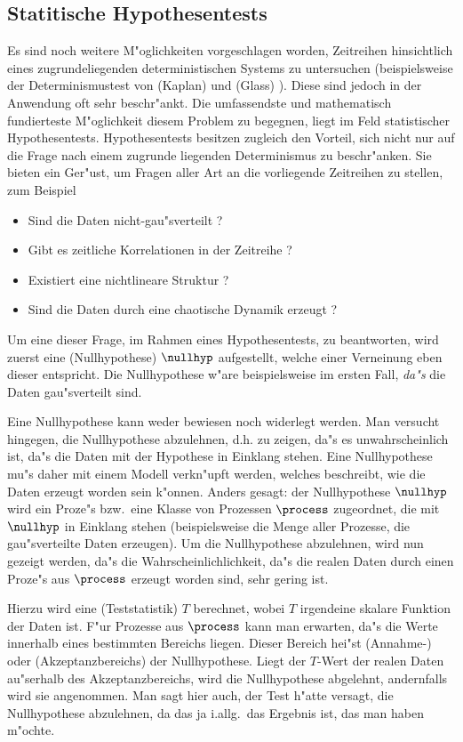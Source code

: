 \subsection{Statitische Hypothesentests}
Es sind noch weitere M"oglichkeiten vorgeschlagen worden, Zeitreihen hinsichtlich eines
zugrundeliegenden deterministischen Systems zu untersuchen (beispielsweise der
Determinismustest von \autor(Kaplan) und \autor(Glass) \cite{Kaplan-glass}).  Diese sind
jedoch in der Anwendung oft sehr beschr"ankt.  Die umfassendste und mathematisch
fundierteste M"oglichkeit diesem Problem zu begegnen, liegt im Feld statistischer
Hypothesentests.  Hypothesentests besitzen zugleich den Vorteil, sich nicht nur auf die
Frage nach einem zugrunde liegenden Determinismus zu beschr"anken.  Sie bieten ein
Ger"ust, um Fragen aller Art an die vorliegende Zeitreihen zu stellen, zum Beispiel
\begin{itemize}
\item Sind die Daten nicht-gau"sverteilt ?
\item Gibt es zeitliche Korrelationen in der Zeitreihe ?
\item Existiert eine nichtlineare Struktur ?
\item Sind die Daten durch eine chaotische Dynamik erzeugt ?
\end{itemize}
Um eine dieser Frage, im Rahmen eines Hypothesentests, zu beantworten, wird zuerst eine
\begriff(Nullhypothese) $\nullhyp$ aufgestellt, welche einer Verneinung eben dieser
entspricht.  Die Nullhypothese w"are beispielsweise im ersten Fall, {\em da"s} die Daten
gau"sverteilt sind.

Eine Nullhypothese kann weder bewiesen noch widerlegt werden. Man versucht hingegen,
die Nullhypothese abzulehnen, d.h. zu zeigen, da"s es unwahrscheinlich ist, da"s die Daten
mit der Hypothese in Einklang stehen. Eine Nullhypothese mu"s daher mit einem Modell
verkn"upft werden, welches beschreibt, wie die Daten erzeugt worden sein k"onnen.
Anders gesagt: der Nullhypothese $\nullhyp$ wird ein Proze"s bzw.\ eine Klasse von
Prozessen $\process$ zugeordnet, die mit $\nullhyp$ in Einklang stehen
(beispielsweise die Menge aller Prozesse, die gau"sverteilte Daten
erzeugen). Um die Nullhypothese abzulehnen, wird nun gezeigt werden, da"s die
Wahrscheinlichlichkeit, da"s die realen Daten durch einen Proze"s aus $\process$
erzeugt worden sind, sehr gering ist. 

Hierzu wird eine \begriff(Teststatistik) $T$ berechnet, wobei $T$ irgendeine skalare
Funktion der Daten ist.  F"ur Prozesse aus $\process$ kann man erwarten, da"s die Werte
innerhalb eines bestimmten Bereichs liegen. Dieser Bereich hei"st \begriff(Annahme-) oder
\begriff(Akzeptanzbereichs) der Nullhypothese.  Liegt der $T$-Wert der realen Daten
au"serhalb des Akzeptanzbereichs, wird die Nullhypothese abgelehnt, andernfalls wird sie
angenommen.  Man sagt hier auch, der Test h"atte versagt, die Nullhypothese abzulehnen, da
das ja i.allg.\ das Ergebnis ist, das man haben m"ochte\footnotemark. 

